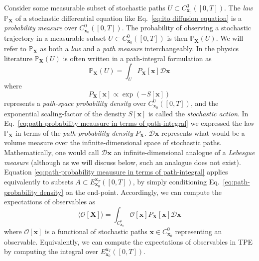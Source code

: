 Consider some measurable subset of stochastic paths $U \subset C_{\mathbf{x}_0}^0([0,T])$. The \textit{law} $\mathbb{P}_\mathbf{X}$ of a stochastic differential equation like Eq.~\ref{eq:ito diffusion equation} is a \textit{probability measure} over $C_{\mathbf{x}_0}^0([0,T])$. The probability of observing a stochastic trajectory in a measurable subset $U \subset C_{\mathbf{x}_0}^0([0,T])$ is then $\mathbb{P}_\mathbf{X}(U)$. We will refer to $\mathbb{P}_\mathbf{X}$ as both a \textit{law} and a \textit{path measure} interchangeably. In the physics literature $\mathbb{P}_\mathbf{X}(U)$ is often written in a path-integral formulation as \citep{huntPathIntegralSolutions1981, adibStochasticActionsDiffusive2008, chaichianPathIntegralsPhysics2001}
\begin{equation} \label{eq:path-probability meausure in terms of path-integral}
\mathbb{P}_\mathbf{X}(U) = \int_U P_\mathbf{X}[\mathbf{x}] \mathcal{D} \mathbf{x}
\end{equation}
where
\begin{equation} \label{eq:path-probability density}
P_\mathbf{X}[\mathbf{x}] \propto \exp(-S[\mathbf{x}])
\end{equation}
represents a \textit{path-space probability density} over $C_{\mathbf{x}_0}^0([0,T])$, and the exponential scaling-factor of the density $S[\mathbf{x}]$ is called the \textit{stochastic action}. In Eq.~\ref{eq:path-probability meausure in terms of path-integral} we expressed the law $\mathbb{P}_\mathbf{X}$ in terms of the \textit{path-probability density} $P_\mathbf{X}$. $\mathcal{D} \mathbf{x}$ represents what would be a volume measure over the infinite-dimensional space of stochastic paths. Mathematically, one would call $\mathcal{D} \mathbf{x}$ an infinite-dimensional analogue of a \textit{Lebesgue measure} (although as we will discuss below, such an analogue does not exist). Equation \ref{eq:path-probability meausure in terms of path-integral} applies equivalently to subsets $A \subset E_{\mathbf{x}_0}^{\mathbf{x}_T}([0,T])$, by simply conditioning Eq.~\ref{eq:path-probability density} on the end-point. Accordingly, we can compute the expectations of observables as
\begin{equation} \label{eq:expectation of observable}
	\langle \mathcal{O}[\mathbf{X}] \rangle = \int_{C_{\mathbf{x}_0}^0} \mathcal{O}[\mathbf{x}] P_\mathbf{X}[\mathbf{x}] \mathcal{D} \mathbf{x}
\end{equation}
where $\mathcal{O}[\mathbf{x}]$ is a functional of stochastic paths $\mathbf{x} \in C_{\mathbf{x}_0}^0$ representing an observable. Equivalently, we can compute the expectations of observables in TPE by computing the integral over $E_{\mathbf{x}_0}^{\mathbf{x}_T}([0,T])$.

